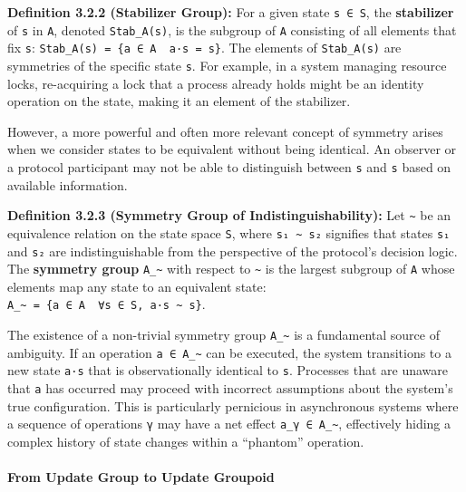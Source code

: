 \documentclass[
]{article}
\begin{document}
\textbf{Definition 3.2.2 (Stabilizer Group):} For a given state
\texttt{s\ ∈\ S}, the \textbf{stabilizer} of \texttt{s} in \texttt{A},
denoted \texttt{Stab\_A(s)}, is the subgroup of \texttt{A} consisting of
all elements that fix \texttt{s}:
\texttt{Stab\_A(s)\ =\ \{a\ ∈\ A\ \textbar{}\ a·s\ =\ s\}}. The elements
of \texttt{Stab\_A(s)} are symmetries of the specific state \texttt{s}.
For example, in a system managing resource locks, re-acquiring a lock
that a process already holds might be an identity operation on the
state, making it an element of the stabilizer.

However, a more powerful and often more relevant concept of symmetry
arises when we consider states to be equivalent without being identical.
An observer or a protocol participant may not be able to distinguish
between \texttt{s} and \texttt{s\textquotesingle{}} based on available
information.

\textbf{Definition 3.2.3 (Symmetry Group of Indistinguishability):} Let
\texttt{\textasciitilde{}} be an equivalence relation on the state space
\texttt{S}, where \texttt{s₁\ \textasciitilde{}\ s₂} signifies that
states \texttt{s₁} and \texttt{s₂} are indistinguishable from the
perspective of the protocol's decision logic. The \textbf{symmetry
group} \texttt{A\_\textasciitilde{}} with respect to
\texttt{\textasciitilde{}} is the largest subgroup of \texttt{A} whose
elements map any state to an equivalent state:
\texttt{A\_\textasciitilde{}\ =\ \{a\ ∈\ A\ \textbar{}\ ∀s\ ∈\ S,\ a·s\ \textasciitilde{}\ s\}}.

The existence of a non-trivial symmetry group
\texttt{A\_\textasciitilde{}} is a fundamental source of ambiguity. If
an operation \texttt{a\ ∈\ A\_\textasciitilde{}} can be executed, the
system transitions to a new state \texttt{a·s} that is observationally
identical to \texttt{s}. Processes that are unaware that \texttt{a} has
occurred may proceed with incorrect assumptions about the system's true
configuration. This is particularly pernicious in asynchronous systems
where a sequence of operations \texttt{γ} may have a net effect
\texttt{a\_γ\ ∈\ A\_\textasciitilde{}}, effectively hiding a complex
history of state changes within a ``phantom'' operation.

\paragraph{From Update Group to Update
Groupoid}\label{from-update-group-to-update-groupoid}
\end{document}

